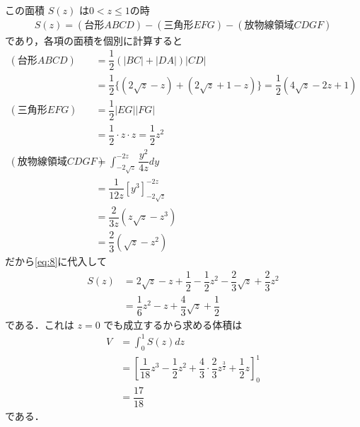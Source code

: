 \documentclass[../../main.tex]{subfiles}
\begin{document}
この面積 $S(z)$ は$0 < z \le 1$の時
\begin{align}
  S(z) = (\text{台形}ABCD) - (\text{三角形}EFG) - (\text{放物線領域}CDGF) \label{eq:8}
\end{align}
であり，各項の面積を個別に計算すると
\begin{align}
  (\text{台形}ABCD)
  &= \dfrac{1}{2}(|BC|+|DA|)|CD| \\
  &= \dfrac{1}{2} \{ (2\sqrt{z}-z) + (2\sqrt{z}+1-z) \} = \dfrac{1}{2}(4\sqrt{z}-2z+1) \\
  (\text{三角形}EFG)
  &= \dfrac{1}{2}|EG||FG| \\
  &= \dfrac{1}{2} \cdot z \cdot z = \dfrac{1}{2}z^2 \\
  (\text{放物線領域}CDGF)
  &= \int_{-2\sqrt{z}}^{-2z} \dfrac{y^2}{4z} dy \\
  &= \dfrac{1}{12z} \left[ y^3 \right]_{-2\sqrt{z}}^{-2z} \\
  &= \dfrac{2}{3z} (z\sqrt{z}-z^3) \\
  &= \dfrac{2}{3} (\sqrt{z}-z^2)
\end{align}
だから\cref{eq:8}に代入して
\begin{align}
  S(z)
  &= 2\sqrt{z} - z + \dfrac{1}{2} - \dfrac{1}{2}z^2 - \dfrac{2}{3}\sqrt{z} + \dfrac{2}{3}z^2 \\
  &= \dfrac{1}{6}z^2 - z + \dfrac{4}{3}\sqrt{z} + \dfrac{1}{2}
\end{align}
である．これは $z=0$ でも成立するから求める体積は
\begin{align}
  V &= \int_0^1 S(z) dz \\
  &= \left[ \dfrac{1}{18}z^3 - \dfrac{1}{2}z^2 + \dfrac{4}{3} \cdot \dfrac{2}{3} z^{\frac{3}{2}} + \dfrac{1}{2}z \right]_0^1 \\
  &= \dfrac{17}{18}
\end{align}
である．
\end{document}
